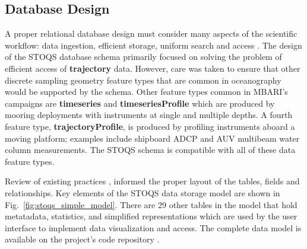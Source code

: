 \documentclass[conference]{IEEEtran}
\begin{document}
\subsection{Database Design}
A proper relational database design must consider many aspects of the scientific workflow: data ingestion, efficient storage, uniform search and access \cite{Bechini:2013:MSS:2425433.2425647}. The design of the STOQS database schema primarily focused on solving the problem of efficient access of \textbf{trajectory} data. However, care was taken to ensure that other discrete sampling geometry feature types \cite{DSG} that are common in oceanography would be supported by the schema.  Other feature types common in MBARI's campaigns are \textbf{timeseries} and \textbf{timeseriesProfile} which are produced by mooring deployments with instruments at single and multiple depths. 
A fourth feature type, \textbf{trajectoryProfile}, is produced by profiling instruments aboard a moving platform; examples include shipboard ADCP and AUV multibeam water column measurements. The STOQS schema is compatible with all of these data feature types.

Review of existing practices \cite{Wright}, \cite{MODB} informed the proper layout of the tables, fields and relationships.  Key elements of the STOQS data storage model are shown in Fig.~\ref{fig:stoqs_simple_model}. There are 29 other tables in the model that hold metatadata, statistics, and simplified representations which are used by the user interface to implement data visualization and access. The complete data model is available on the project's code repository \cite{STOQS}. 
\end{document}
